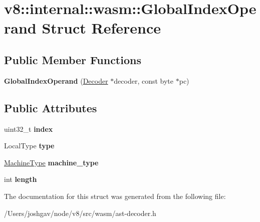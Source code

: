 \hypertarget{structv8_1_1internal_1_1wasm_1_1_global_index_operand}{}\section{v8\+:\+:internal\+:\+:wasm\+:\+:Global\+Index\+Operand Struct Reference}
\label{structv8_1_1internal_1_1wasm_1_1_global_index_operand}
\subsection*{Public Member Functions}
\begin{DoxyCompactItemize}
\item 
{\bfseries Global\+Index\+Operand} (\hyperlink{classv8_1_1internal_1_1wasm_1_1_decoder}{Decoder} $\ast$decoder, const byte $\ast$pc)\hypertarget{structv8_1_1internal_1_1wasm_1_1_global_index_operand_a0044e4215ad054841be258fbe76fb2be}{}\label{structv8_1_1internal_1_1wasm_1_1_global_index_operand_a0044e4215ad054841be258fbe76fb2be}

\end{DoxyCompactItemize}
\subsection*{Public Attributes}
\begin{DoxyCompactItemize}
\item 
uint32\+\_\+t {\bfseries index}\hypertarget{structv8_1_1internal_1_1wasm_1_1_global_index_operand_a62fedc540e3dba2a2f6f30fe82188bcd}{}\label{structv8_1_1internal_1_1wasm_1_1_global_index_operand_a62fedc540e3dba2a2f6f30fe82188bcd}

\item 
Local\+Type {\bfseries type}\hypertarget{structv8_1_1internal_1_1wasm_1_1_global_index_operand_a87923280b177a4737e6530c54271f447}{}\label{structv8_1_1internal_1_1wasm_1_1_global_index_operand_a87923280b177a4737e6530c54271f447}

\item 
\hyperlink{classv8_1_1internal_1_1_machine_type}{Machine\+Type} {\bfseries machine\+\_\+type}\hypertarget{structv8_1_1internal_1_1wasm_1_1_global_index_operand_a18fa1b711c26d0a986b5e069d0cfdf7e}{}\label{structv8_1_1internal_1_1wasm_1_1_global_index_operand_a18fa1b711c26d0a986b5e069d0cfdf7e}

\item 
int {\bfseries length}\hypertarget{structv8_1_1internal_1_1wasm_1_1_global_index_operand_ad5cd1522310c74674930df4c8a994c33}{}\label{structv8_1_1internal_1_1wasm_1_1_global_index_operand_ad5cd1522310c74674930df4c8a994c33}

\end{DoxyCompactItemize}


The documentation for this struct was generated from the following file\+:\begin{DoxyCompactItemize}
\item 
/\+Users/joshgav/node/v8/src/wasm/ast-\/decoder.\+h\end{DoxyCompactItemize}
